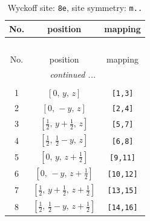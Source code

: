 \documentclass[fleqn,8pt]{jsarticle}
\begin{document}
\begin{longtable}{ccc}
\caption{Wyckoff site: {\tt 8e}, site symmetry: {\tt m..}}
 \\
 \hline \hline
No. & position & mapping \\ \hline \endfirsthead

\multicolumn{2}{l}{\tablename\ \thetable{}} \\
 \hline \hline
No. & position & mapping \\ \hline \endhead

 \hline \hline
\multicolumn{2}{r}{\footnotesize\it continued ...} \\ \endfoot

 \hline \hline
\multicolumn{2}{r}{} \\ \endlastfoot

1 & $\left[ 0,\, y,\, z \right]$ & {\tt [1,3]} \\ \hline
2 & $\left[ 0,\, - y,\, z \right]$ & {\tt [2,4]} \\ \hline
3 & $\left[ \frac{1}{2},\, y + \frac{1}{2},\, z \right]$ & {\tt [5,7]} \\ \hline
4 & $\left[ \frac{1}{2},\, \frac{1}{2} - y,\, z \right]$ & {\tt [6,8]} \\ \hline
5 & $\left[ 0,\, y,\, z + \frac{1}{2} \right]$ & {\tt [9,11]} \\ \hline
6 & $\left[ 0,\, - y,\, z + \frac{1}{2} \right]$ & {\tt [10,12]} \\ \hline
7 & $\left[ \frac{1}{2},\, y + \frac{1}{2},\, z + \frac{1}{2} \right]$ & {\tt [13,15]} \\ \hline
8 & $\left[ \frac{1}{2},\, \frac{1}{2} - y,\, z + \frac{1}{2} \right]$ & {\tt [14,16]} \\
\end{longtable}
\renewcommand{\arraystretch}{1.2}
\end{document}
